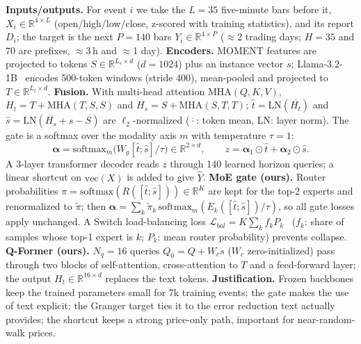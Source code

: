 \documentclass{article}
\newcommand{\R}{\mathbb{R}}
\begin{document}
\textbf{Inputs/outputs.} For event $i$ we take the $L=35$ five-minute bars before it, $X_i\in\R^{4\times L}$ (open/high/low/close, z-scored with training statistics), and its report $D_i$; the target is the next $P=140$ bars $Y_i\in\R^{4\times P}$ ($\approx$2 trading days; $H=35$ and $70$ are prefixes, $\approx$3\,h and $\approx$1 day).
\textbf{Encoders.} MOMENT features are projected to tokens $S\in\R^{L_s\times d}$ ($d=1024$) plus an instance vector $s$; Llama-3.2-1B~\cite{llama3} encodes 500-token windows (stride 400), mean-pooled and projected to $T\in\R^{L_t\times d}$.
\textbf{Fusion.} With multi-head attention $\mathrm{MHA}(Q,K,V)$, $H_t = T + \mathrm{MHA}(T,S,S)$ and $H_s = S + \mathrm{MHA}(S,T,T)$; $\hat t=\mathrm{LN}(\overline{H_t})$ and $\hat s=\mathrm{LN}(\overline{H_s}+s-\overline{S})$ are $\ell_2$-normalized ($\overline{\cdot}$: token mean, LN: layer norm). The gate is a softmax over the modality axis $m$ with temperature $\tau=1$:
\begin{equation}
\bm\alpha=\mathrm{softmax}_{m}\big(W_g[\hat t;\hat s]/\tau\big)\in\R^{2\times d},\qquad z=\bm\alpha_{1}\odot\hat t+\bm\alpha_{2}\odot\hat s .
\end{equation}
A 3-layer transformer decoder reads $z$ through 140 learned horizon queries; a linear shortcut on $\mathrm{vec}(X)$ is added to give $\hat Y$.
\textbf{MoE gate (ours).} Router probabilities $\pi=\mathrm{softmax}(R([\hat t;\hat s]))\in\R^{K}$ are kept for the top-2 experts and renormalized to $\tilde\pi$; then $\bm\alpha=\sum_k\tilde\pi_k\,\mathrm{softmax}_m(E_k([\hat t;\hat s])/\tau)$, so all gate losses apply unchanged. A Switch load-balancing loss $\mathcal{L}_{bal}=K\sum_k f_kP_k$~\cite{switch} ($f_k$: share of samples whose top-1 expert is $k$; $P_k$: mean router probability) prevents collapse.
\textbf{Q-Former (ours).} $N_q=16$ queries $Q_0=Q+W_c s$ ($W_c$ zero-initialized) pass through two blocks of self-attention, cross-attention to $T$ and a feed-forward layer; the output $H_t\in\R^{16\times d}$ replaces the text tokens.
\textbf{Justification.} Frozen backbones keep the trained parameters small for 7k training events; the gate makes the use of text explicit; the Granger target ties it to the error reduction text actually provides; the shortcut keeps a strong price-only path, important for near-random-walk prices.

\end{document}
